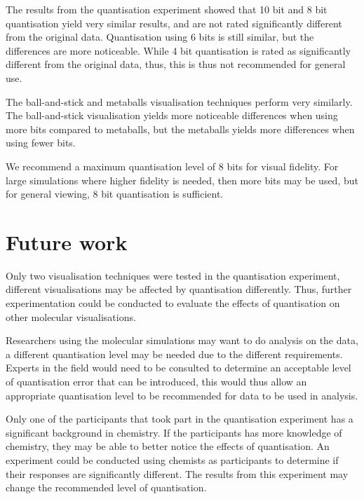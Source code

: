 The results from the quantisation experiment showed that 10 bit and 8 bit
quantisation yield very similar results, and are not rated significantly
different from the original data. Quantisation using 6 bits is still similar,
but the differences are more noticeable. While 4 bit quantisation is rated as
significantly different from the original data, thus, this is thus not
recommended for general use.

The ball-and-stick and metaballs visualisation techniques perform very
similarly. The ball-and-stick visualisation yields more noticeable differences
when using more bits compared to metaballs, but the metaballs yields more
differences when using fewer bits.

We recommend a maximum quantisation level of 8 bits for visual fidelity. For
large simulations where higher fidelity is needed, then more bits may be used,
but for general viewing, 8 bit quantisation is sufficient.


\section{Future work}
\label{sec:conclusion_future}

Only two visualisation techniques were tested in the quantisation experiment,
different visualisations may be affected by quantisation differently. Thus,
further experimentation could be conducted to evaluate the effects of
quantisation on other molecular visualisations.

Researchers using the molecular simulations may want to do analysis on the
data, a different quantisation level may be needed due to the different
requirements. Experts in the field would need to be consulted to determine an
acceptable level of quantisation error that can be introduced, this would thus
allow an appropriate quantisation level to be recommended for data to be used
in analysis.

Only one of the participants that took part in the quantisation experiment has
a significant background in chemistry. If the participants has more knowledge
of chemistry, they may be able to better notice the effects of quantisation. An
experiment could be conducted using chemists as participants to determine if
their responses are significantly different. The results from this experiment
may change the recommended level of quantisation.



